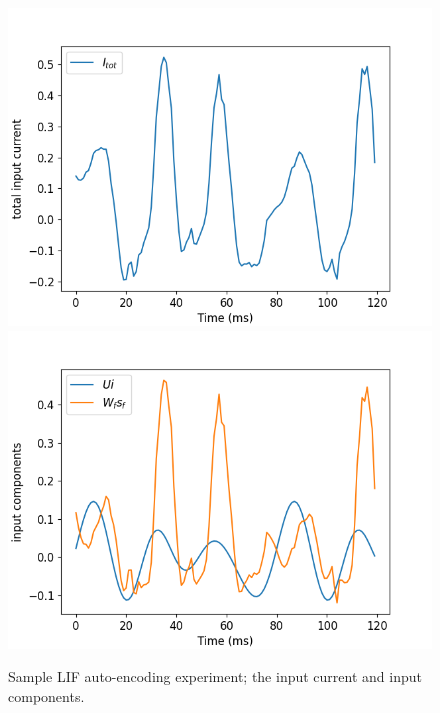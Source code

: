 \documentclass[mphil,deptreport,ianc]{infthesis} %
\begin{document}

\begin{figure}[!h]
    \centering
    \includegraphics[width=0.49\columnwidth]{figures/Supplementary/gating/LIF/AutoEncoding/01-04_16-35-37-680/test_plot_I_tot_LIF_seed_23.png}
    \includegraphics[width=0.49\columnwidth]{figures/Supplementary/gating/LIF/AutoEncoding/01-04_16-35-37-680/test_plot_input_components_LIF_seed_23.png}
    \caption{Sample LIF auto-encoding experiment; the input current and input components.}
    \label{fig:LIF_AE_1_I_tot_in_comp}
\end{figure}
\end{document}

